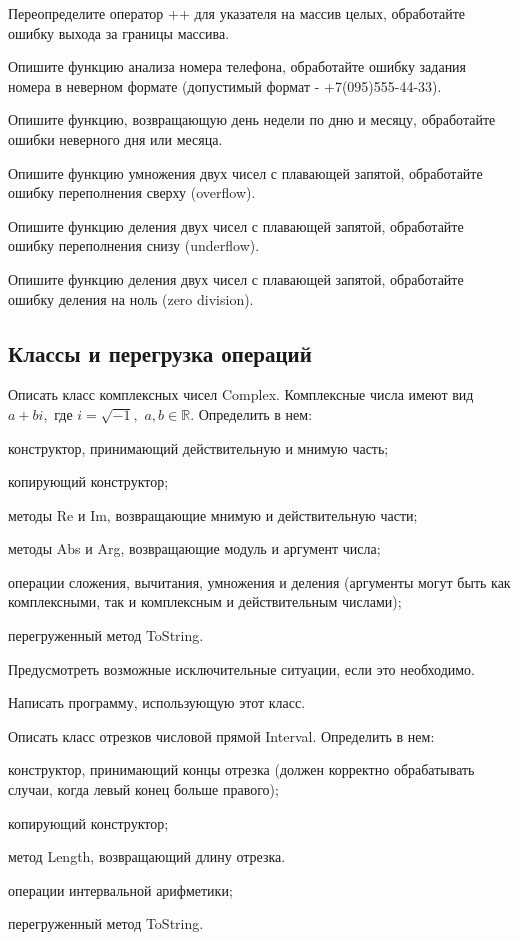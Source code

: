 \task Переопределите оператор ++ для указателя на массив целых, обработайте ошибку выхода за границы массива.

\task Опишите функцию анализа номера телефона, обработайте ошибку задания номера в неверном формате (допустимый формат - +7(095)555-44-33).

\task 

\task Опишите функцию, возвращающую день недели по дню и месяцу, обработайте ошибки неверного дня или месяца.

\task Опишите функцию умножения двух чисел с плавающей запятой, обработайте ошибку переполнения сверху (overflow).

\task Опишите функцию деления двух чисел с плавающей запятой, обработайте ошибку переполнения снизу (underflow).

\task Опишите функцию деления двух чисел с плавающей запятой, обработайте ошибку деления на ноль (zero division).


\subsection{Классы и перегрузка операций}

\task Описать класс комплексных чисел Complex. Комплексные числа имеют
вид $a+bi,$ где $i=\sqrt{-1},$ $a,b \in \mathbb{R}$. Определить в нем:
\begin{itemize*}
\item конструктор, принимающий действительную и мнимую часть;
\item копирующий конструктор;
\item методы Re и Im, возвращающие мнимую и действительную части;
\item методы Abs и Arg, возвращающие модуль и аргумент числа;
\item операции сложения, вычитания, умножения и деления (аргументы
  могут быть как комплексными, так и комплексным и действительным
  числами);
\item перегруженный метод ToString.
\end{itemize*}

Предусмотреть возможные исключительные ситуации, если это необходимо.

Написать программу, использующую этот класс.

\task Описать класс отрезков числовой прямой Interval. Определить в нем:
\begin{itemize*}
\item конструктор, принимающий концы отрезка (должен корректно
  обрабатывать случаи, когда левый конец больше правого);
\item копирующий конструктор;
\item метод Length, возвращающий длину отрезка.
\item операции интервальной арифметики;
\item перегруженный метод ToString.
\end{itemize*}


